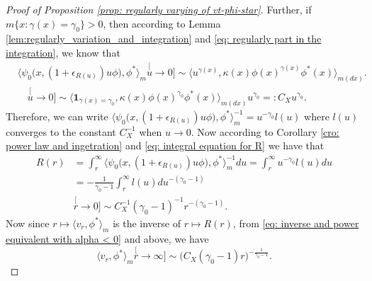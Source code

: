 \documentclass[12pt, a4paper]{amsart}
\theoremstyle{definition}
\numberwithin{equation}{section}
\begin{document}
\begin{proof}[Proof of Proposition \ref{prop: regularly varying of vt-phi-star}]
	Further, if $m\{x: \gamma(x) = \gamma_0\}> 0$, then according to Lemma \ref{lem:regularly_variation_and_integration} and \eqref{eq: regularly part in the integration}, we know that
\[\begin{split}
	&\big\langle \psi_0 \big(x,( 1 + \epsilon_{R(u)} ) u \phi \big), \phi^* \big\rangle_m
	\stackrel[u\to 0]{}{\sim}  \langle u^{\gamma(x)} , \kappa (x)\phi(x)^{\gamma(x)} \phi^*(x)
	\rangle_{m(dx)}.
	\\ &\quad \stackrel[u\to 0]{}{\sim}  \langle \mathbf 1_{\gamma(x)= \gamma_0}, \kappa (x)\phi(x)^{\gamma_0} \phi^*(x)
	\rangle_{m(dx)} u^{\gamma_0}
	=: C_X u^{\gamma_0}.
\end{split}\]
	Therefore, we can write $\big\langle \psi_0 \big(x,( 1 + \epsilon_{R(u)} ) u \phi \big), \phi^* \big\rangle_m^{-1} = u^{-\gamma_0} l(u)$ where $l(u)$ converges to the constant $C_X^{-1}$ when $u \to 0$.
	Now according to
	Corollary \ref{cro: power law and ingetration} and \eqref{eq: integral equation for R}
	we have that
\[\begin{split}
	R(r)
	&= \int_r^\infty \big\langle \psi_0 \big(x,( 1 + \epsilon_{R(u)} ) u \phi \big), \phi^* \big\rangle_m^{-1} du
	= \int_r^\infty u^{-\gamma_0} l(u) du
	\\&= -\frac{1}{\gamma_0-1}\int_r^\infty l(u) du^{-(\gamma_0 - 1)}
	\\&\stackrel[r\to 0]{}{\sim} C_X^{-1} (\gamma_0-1)^{-1} r^{-(\gamma_0 - 1)}.
\end{split}\]
	Now since $r\mapsto \langle v_r,\phi^*\rangle_m$ is the inverse of $r\mapsto R(r)$, from
	\eqref{eq: inverse and power equivalent with alpha < 0} and above,
	we have
\[
	\langle v_r,\phi^*\rangle_m
	\stackrel[r\to \infty]{}{\sim} \big(C_X (\gamma_0-1) r \big)^{-\frac{1}{\gamma_0 - 1}}.
\]
\end{proof}
\end{document}
